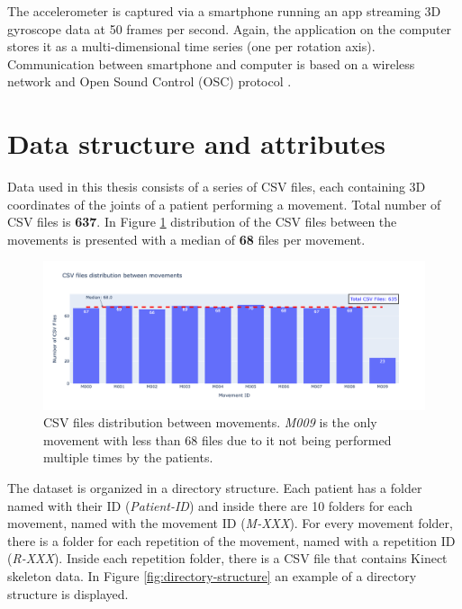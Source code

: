                     The accelerometer is captured via a smartphone running an app streaming 3D gyroscope data at 50 frames per second. Again, the application on the computer stores it as a multi-dimensional time series (one per rotation axis). Communication between smartphone and computer is based on a wireless network and Open Sound Control (OSC) protocol \cite{wright_open_nodate}.
    
    \section{Data structure and attributes}
            
            Data used in this thesis consists of a series of CSV files, each containing 3D coordinates of the joints of a patient performing a movement. Total number of CSV files is \textbf{637}. In Figure \ref{fig:dataset_files} distribution of the CSV files between the movements is presented with a median of \textbf{68} files per movement.

            \begin{figure}[H]
                \centering 
                \includegraphics[width=1.0\textwidth]{./resources/plots/patients/csv_files.png}
                \caption{CSV files distribution between movements. \textit{M009} is the only movement with less than 68 files due to it not being performed multiple times by the patients.}
                \label{fig:dataset_files}
            \end{figure}
        
            The dataset is organized in a directory structure. Each patient has a folder named with their ID (\textit{Patient-ID}) and inside there are 10 folders for each movement, named with the movement ID (\textit{M-XXX}). For every movement folder, there is a folder for each repetition of the movement, named with a repetition ID (\textit{R-XXX}). Inside each repetition folder, there is a CSV file that contains Kinect skeleton data. In Figure \ref{fig:directory-structure} an example of a directory structure is displayed. \\
            
